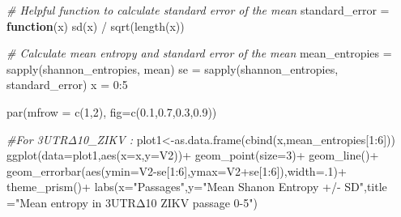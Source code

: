 \documentclass[
]{article}
\newenvironment{Shaded}{\begin{snugshade}}{\end{snugshade}}
\newcommand{\AttributeTok}[1]{\textcolor[rgb]{0.77,0.63,0.00}{#1}}
\newcommand{\CommentTok}[1]{\textcolor[rgb]{0.56,0.35,0.01}{\textit{#1}}}
\newcommand{\ControlFlowTok}[1]{\textcolor[rgb]{0.13,0.29,0.53}{\textbf{#1}}}
\newcommand{\DecValTok}[1]{\textcolor[rgb]{0.00,0.00,0.81}{#1}}
\newcommand{\FloatTok}[1]{\textcolor[rgb]{0.00,0.00,0.81}{#1}}
\newcommand{\FunctionTok}[1]{\textcolor[rgb]{0.00,0.00,0.00}{#1}}
\newcommand{\NormalTok}[1]{#1}
\newcommand{\OtherTok}[1]{\textcolor[rgb]{0.56,0.35,0.01}{#1}}
\newcommand{\SpecialCharTok}[1]{\textcolor[rgb]{0.00,0.00,0.00}{#1}}
\newcommand{\StringTok}[1]{\textcolor[rgb]{0.31,0.60,0.02}{#1}}
\begin{document}
\begin{Shaded}
\begin{Highlighting}[]
\CommentTok{\# Helpful function to calculate standard error of the mean}
\NormalTok{standard\_error }\OtherTok{=} \ControlFlowTok{function}\NormalTok{(x) }\FunctionTok{sd}\NormalTok{(x) }\SpecialCharTok{/} \FunctionTok{sqrt}\NormalTok{(}\FunctionTok{length}\NormalTok{(x))}

\CommentTok{\# Calculate mean entropy and standard error of the mean}
\NormalTok{mean\_entropies }\OtherTok{=} \FunctionTok{sapply}\NormalTok{(shannon\_entropies, mean)}
\NormalTok{se }\OtherTok{=} \FunctionTok{sapply}\NormalTok{(shannon\_entropies, standard\_error)}
\NormalTok{x }\OtherTok{=} \DecValTok{0}\SpecialCharTok{:}\DecValTok{5}
\end{Highlighting}
\end{Shaded}

\begin{Shaded}
\begin{Highlighting}[]
\FunctionTok{par}\NormalTok{(}\AttributeTok{mfrow =} \FunctionTok{c}\NormalTok{(}\DecValTok{1}\NormalTok{,}\DecValTok{2}\NormalTok{), }\AttributeTok{fig=}\FunctionTok{c}\NormalTok{(}\FloatTok{0.1}\NormalTok{,}\FloatTok{0.7}\NormalTok{,}\FloatTok{0.3}\NormalTok{,}\FloatTok{0.9}\NormalTok{))}

\CommentTok{\#For 3\textquotesingle{}UTRΔ10\_ZIKV :}
\NormalTok{plot1}\OtherTok{\textless{}{-}}\FunctionTok{as.data.frame}\NormalTok{(}\FunctionTok{cbind}\NormalTok{(x,mean\_entropies[}\DecValTok{1}\SpecialCharTok{:}\DecValTok{6}\NormalTok{]))}
\FunctionTok{ggplot}\NormalTok{(}\AttributeTok{data=}\NormalTok{plot1,}\FunctionTok{aes}\NormalTok{(}\AttributeTok{x=}\NormalTok{x,}\AttributeTok{y=}\NormalTok{V2))}\SpecialCharTok{+}
  \FunctionTok{geom\_point}\NormalTok{(}\AttributeTok{size=}\DecValTok{3}\NormalTok{)}\SpecialCharTok{+}
  \FunctionTok{geom\_line}\NormalTok{()}\SpecialCharTok{+}
  \FunctionTok{geom\_errorbar}\NormalTok{(}\FunctionTok{aes}\NormalTok{(}\AttributeTok{ymin=}\NormalTok{V2}\SpecialCharTok{{-}}\NormalTok{se[}\DecValTok{1}\SpecialCharTok{:}\DecValTok{6}\NormalTok{],}\AttributeTok{ymax=}\NormalTok{V2}\SpecialCharTok{+}\NormalTok{se[}\DecValTok{1}\SpecialCharTok{:}\DecValTok{6}\NormalTok{]),}\AttributeTok{width=}\NormalTok{.}\DecValTok{1}\NormalTok{)}\SpecialCharTok{+}
  \FunctionTok{theme\_prism}\NormalTok{()}\SpecialCharTok{+}
  \FunctionTok{labs}\NormalTok{(}\AttributeTok{x=}\StringTok{"Passages"}\NormalTok{,}\AttributeTok{y=}\StringTok{"Mean Shanon Entropy +/{-} SD"}\NormalTok{,}\AttributeTok{title =}\StringTok{"Mean entropy in 3\textquotesingle{}UTRΔ10 ZIKV passage 0{-}5"}\NormalTok{)}
\end{Highlighting}
\end{Shaded}
\end{document}
